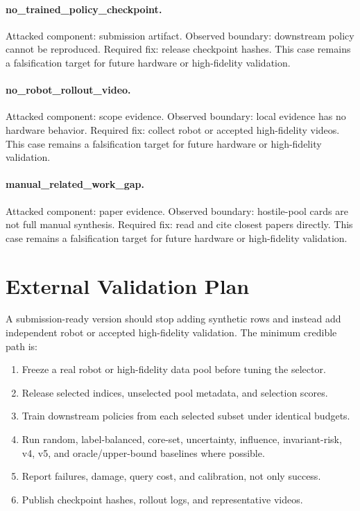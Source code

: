 \documentclass{article}
\begin{document}
\paragraph{no\_trained\_policy\_checkpoint.} Attacked component: submission artifact. Observed boundary: downstream policy cannot be reproduced. Required fix: release checkpoint hashes. This case remains a falsification target for future hardware or high-fidelity validation.
\paragraph{no\_robot\_rollout\_video.} Attacked component: scope evidence. Observed boundary: local evidence has no hardware behavior. Required fix: collect robot or accepted high-fidelity videos. This case remains a falsification target for future hardware or high-fidelity validation.
\paragraph{manual\_related\_work\_gap.} Attacked component: paper evidence. Observed boundary: hostile-pool cards are not full manual synthesis. Required fix: read and cite closest papers directly. This case remains a falsification target for future hardware or high-fidelity validation.
\clearpage
\section{External Validation Plan}
A submission-ready version should stop adding synthetic rows and instead add independent robot or accepted high-fidelity validation. The minimum credible path is:
\begin{enumerate}
\item Freeze a real robot or high-fidelity data pool before tuning the selector.
\item Release selected indices, unselected pool metadata, and selection scores.
\item Train downstream policies from each selected subset under identical budgets.
\item Run random, label-balanced, core-set, uncertainty, influence, invariant-risk, v4, v5, and oracle/upper-bound baselines where possible.
\item Report failures, damage, query cost, and calibration, not only success.
\item Publish checkpoint hashes, rollout logs, and representative videos.
\end{enumerate}
\end{document}
